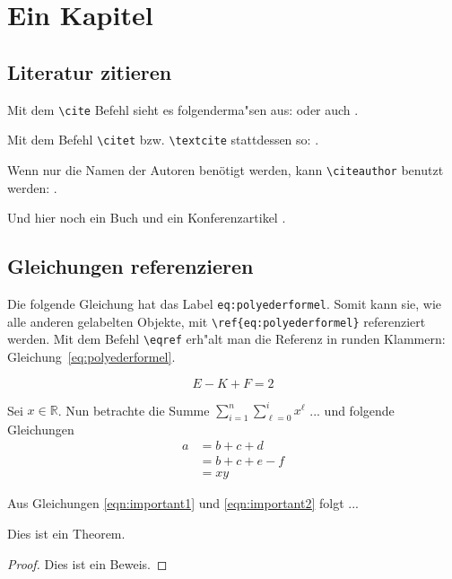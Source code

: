 \section{Ein Kapitel}
\label{sec:kapitel}

\subsection{Literatur zitieren}

Mit dem \texttt{\textbackslash{}cite} Befehl sieht es folgenderma"sen aus:
\cite{Lehnfeld2014} oder auch \cite{Vidal2013}.

Mit dem Befehl \texttt{\textbackslash{}citet} bzw. \texttt{\textbackslash{}textcite} stattdessen so:
\textcite{Lehnfeld2014}.

Wenn nur die Namen der Autoren benötigt werden, kann
\texttt{\textbackslash{}citeauthor} benutzt werden: \citeauthor{Lehnfeld2014}.

Und hier noch ein Buch \cite{Brucker2007} und ein Konferenzartikel 
\cite{Huang2010}.

\subsection{Gleichungen referenzieren}
\label{sec:gleichungen-referenzieren}

Die folgende Gleichung hat das Label \texttt{eq:polyederformel}.
Somit kann sie, wie alle anderen gelabelten Objekte, mit
\texttt{\textbackslash{}ref\{eq:polyederformel\}}
referenziert werden.
Mit dem Befehl \texttt{\textbackslash{}eqref} 
erh"alt man die Referenz in runden Klammern: 
Gleichung~\eqref{eq:polyederformel}.

\begin{equation}
  \label{eq:polyederformel}
  E - K + F = 2
\end{equation}

Sei $x \in \mathbb{R}$. Nun betrachte die Summe $\sum_{i=1}^n \sum_{\ell = 0}^{i} x^\ell$ ... und folgende Gleichungen
\begin{align}
a &= b + c + d      \label{eqn:important1} \\
  &= b + c + e - f  \nonumber \\
  &= xy             \label{eqn:important2}
\end{align}

Aus Gleichungen \eqref{eqn:important1} und \eqref{eqn:important2} folgt ...

\begin{mytheorem}
	Dies ist ein Theorem.
\end{mytheorem}
\begin{proof}
	Dies ist ein Beweis.
\end{proof}

